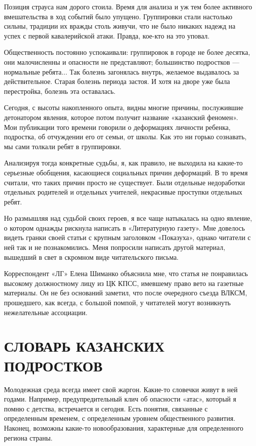 \documentclass[12pt, a4paper, openany]{book}
\begin{document}
Позиция страуса нам дорого стоила. Время для анализа и уж тем более активного вмешательства в ход событий было упущено. Группировки стали настолько сильны, традиции их вражды столь живучи, что не было никаких надежд на успех с первой кавалерийской атаки. Правда, кое-кто на это упо­вал.

Общественность постоянно успокаивали: группировок в городе не более десятка, они малочисленны и опасности не представляют; большинство подростков — нормальные ребята... Так болезнь загонялась внутрь, желаемое выдавалось за действительное. Старая бо­лезнь периода застоя. И хотя на дворе уже была перестройка, болезнь эта оставалась.

Сегодня, с высоты накопленного опыта, видны мно­гие причины, послужившие детонатором явления, которое потом получит название «казанский феномен». Мои публикации того времени говорили о деформациях личности   ребенка, подростка, об отчуждении его от семьи, от школы. Как это ни горько сознавать, мы сами толкали ребят в группировки.

Анализируя тогда конкретные судьбы, я, как пра­вило, не выходила на какие-то серьезные обобщения, касающиеся социальных причин деформаций. В то время считали, что таких причин просто не существует. Были отдельные недоработки отдельных родителей и отдель­ных учителей, некрасивые проступки отдельных ре­бят.

Но размышляя над судьбой своих героев, я все чаще натыкалась на одно явление, о котором однажды рискнула написать в «Литературную газету». Мне дове­лось видеть гранки своей статьи с крупным заголов­ком «Показуха», однако читатели с ней так и не познакомились. Меня попросили написать другой ма­териал, вышедший в свет в скромном виде читатель­ского письма.

Корреспондент «ЛГ» Елена Шиманко объяснила мне, что статья не понравилась высокому должностно­му лицу из ЦК КПСС, имевшему право вето на газетные материалы. Он не без оснований заметил, что после очередного съезда ВЛКСМ, прошедшего, как всегда, с большой помпой, у читателей могут возникнуть нежелатель­ные ассоциации.

	\newpage

\section[Словарь казанских подростков]{\center \textbf{СЛОВАРЬ КАЗАНСКИХ ПОДРОСТКОВ}}
Молодежная среда всегда имеет свой жаргон. Какие-то словечки живут в ней годами. Например, предупредительный клич об опасности «атас», который я помню с детства, встречается и сегодня. Есть понятия, связанные с определенным временем, с определенным уровнем общественного развития. Наконец, возможны какие-то новообразования, характерные для определенного региона страны. 
\end{document}
